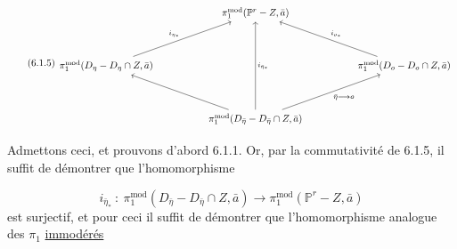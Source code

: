 \begin{equation}\tag{6.1.5}
\begin{tikzcd}[column sep=huge, row sep=huge]
 {} & \pi_1^{\mathrm{mod}}(\mathbb{P}^r-Z,\bar{a}) & {} \\
\pi_1^{\mathrm{mod}}(D_{\eta} - D_{\eta} \cap Z,\bar{a}) \arrow[ur, "i_{\eta_*}"] & {} & \pi_1^{\mathrm{mod}}(D_o - D_o \cap Z,\bar{a}) \arrow[ul, "i_{o_*}"'] \\
 {} & \pi_1^{\mathrm{mod}}(D_{\bar{\eta}} - D_{\bar{\eta}} \cap Z,\bar{a}) \arrow[uu, "i_{\bar{\eta}_*}"'] \arrow[ul] \arrow[ur, "\bar{\eta} \longrightarrow o"'] &
{} \end{tikzcd}
\end{equation}


Admettons ceci, et prouvons d'abord 6.1.1. Or, par la commutativité de 6.1.5, il suffit de démontrer que l'homomorphisme

\begin{equation*}
i_{\bar{\eta}_*} \ : \ \pi_1^{\mathrm{mod}}(D_{\bar{\eta}} - D_{\bar{\eta}} \cap Z, \bar{a}) \longrightarrow \pi_1^{\mathrm{mod}}(\mathbb{P}^r - Z, \bar{a})
\end{equation*}
est surjectif, et pour ceci il suffit de démontrer que l'homomorphisme analogue des $\pi_1$ \underline{immodérés}


